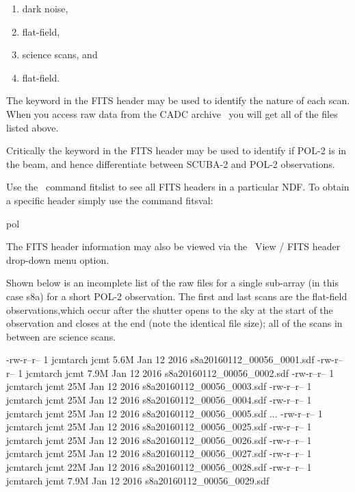 \begin{enumerate}\itemsep-0.2em
\item dark noise,
\item flat-field,
\item science scans, and
\item flat-field.
\end{enumerate}


The  keyword in the FITS header may be used to
identify the nature of each scan.  When you access raw data from the
CADC archive
\
you will get all of the files listed above.


Critically the  keyword in the FITS header may be used
to identify if POL-2 is in the beam, and hence differentiate between
SCUBA-2 and POL-2 observations.


\begin{tip}
  Use the \Kappa\ command fitslist to see all FITS headers in a
  particular NDF. To obtain a specific header simply use the command
  fitsval:
  \begin{terminalv}
pol
\end{terminalv}
The FITS header information may also be viewed via the \gaia\ View /
FITS header drop-down menu option.
\end{tip}

Shown below is an incomplete list of the raw files for a single
sub-array (in this case s8a) for a short POL-2 observation. The first
and last scans are the flat-field observations,which occur after the
shutter opens to the sky at the start of the observation and closes at
the end (note the identical file size); all of the scans in between
are science scans.


\begin{terminalv}
\end{terminalv}

\begin{terminalv}
-rw-r--r-- 1 jcmtarch jcmt 5.6M Jan 12  2016 s8a20160112_00056_0001.sdf
-rw-r--r-- 1 jcmtarch jcmt 7.9M Jan 12  2016 s8a20160112_00056_0002.sdf
-rw-r--r-- 1 jcmtarch jcmt  25M Jan 12  2016 s8a20160112_00056_0003.sdf
-rw-r--r-- 1 jcmtarch jcmt  25M Jan 12  2016 s8a20160112_00056_0004.sdf
-rw-r--r-- 1 jcmtarch jcmt  25M Jan 12  2016 s8a20160112_00056_0005.sdf
...
-rw-r--r-- 1 jcmtarch jcmt  25M Jan 12  2016 s8a20160112_00056_0025.sdf
-rw-r--r-- 1 jcmtarch jcmt  25M Jan 12  2016 s8a20160112_00056_0026.sdf
-rw-r--r-- 1 jcmtarch jcmt  25M Jan 12  2016 s8a20160112_00056_0027.sdf
-rw-r--r-- 1 jcmtarch jcmt  22M Jan 12  2016 s8a20160112_00056_0028.sdf
-rw-r--r-- 1 jcmtarch jcmt 7.9M Jan 12  2016 s8a20160112_00056_0029.sdf
\end{terminalv}

